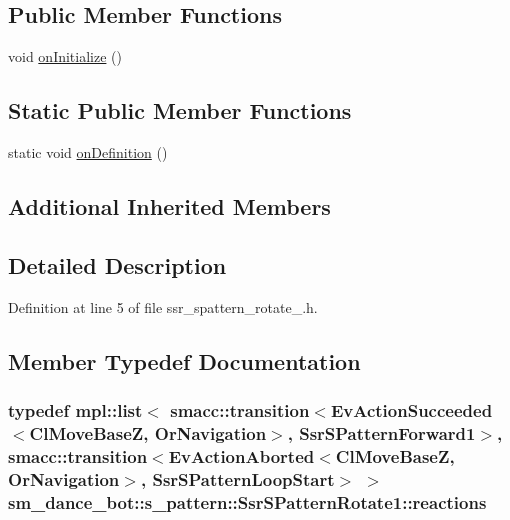 \subsection*{Public Member Functions}
\begin{DoxyCompactItemize}
\item 
void \hyperlink{structsm__dance__bot_1_1s__pattern_1_1SsrSPatternRotate1_a53a66e457f25feeedb99c3fe25f844ef}{on\+Initialize} ()
\end{DoxyCompactItemize}
\subsection*{Static Public Member Functions}
\begin{DoxyCompactItemize}
\item 
static void \hyperlink{structsm__dance__bot_1_1s__pattern_1_1SsrSPatternRotate1_a0410d8fa58ad96777f0153c1f0a8827f}{on\+Definition} ()
\end{DoxyCompactItemize}
\subsection*{Additional Inherited Members}


\subsection{Detailed Description}


Definition at line 5 of file ssr\+\_\+spattern\+\_\+rotate\+\_.\+h.



\subsection{Member Typedef Documentation}
\subsubsection[{\texorpdfstring{reactions}{reactions}}]{\setlength{\rightskip}{0pt plus 5cm}typedef mpl\+::list$<$ {\bf smacc\+::transition}$<$Ev\+Action\+Succeeded$<${\bf Cl\+Move\+BaseZ}, {\bf Or\+Navigation}$>$, {\bf Ssr\+S\+Pattern\+Forward1}$>$, {\bf smacc\+::transition}$<$Ev\+Action\+Aborted$<${\bf Cl\+Move\+BaseZ}, {\bf Or\+Navigation}$>$, {\bf Ssr\+S\+Pattern\+Loop\+Start}$>$ $>$ {\bf sm\+\_\+dance\+\_\+bot\+::s\+\_\+pattern\+::\+Ssr\+S\+Pattern\+Rotate1\+::reactions}}\hypertarget{structsm__dance__bot_1_1s__pattern_1_1SsrSPatternRotate1_af85bb149a542bbfdbd82c2e396d36907}{}\label{structsm__dance__bot_1_1s__pattern_1_1SsrSPatternRotate1_af85bb149a542bbfdbd82c2e396d36907}


